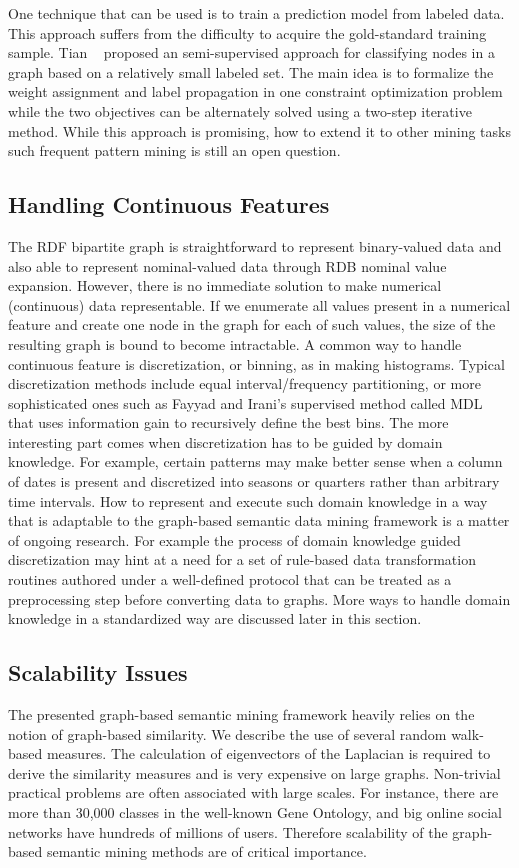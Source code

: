 One technique that can be used is to train a prediction model from labeled data. This approach suffers from the difficulty to acquire the gold-standard training sample. Tian \etal~\cite{Tian2009AHyper} proposed an semi-supervised approach for classifying nodes in a graph based on a relatively small labeled set. The main idea is to formalize the weight assignment and label propagation in one constraint optimization problem while the two objectives can be alternately solved using a two-step iterative method. While this approach is promising, how to extend it to other mining tasks such frequent pattern mining is still an open question.

\subsection{Handling Continuous Features}
The RDF bipartite graph is straightforward to represent binary-valued data and also able to represent nominal-valued data through RDB nominal value expansion. However, there is no immediate solution to make numerical (continuous) data representable. If we enumerate all values present in a numerical feature and create one node in the graph for each of such values, the size of the resulting graph is bound to become intractable. A common way to handle continuous feature is discretization, or binning, as in making histograms. Typical discretization methods include equal interval/frequency partitioning, or more sophisticated ones such as Fayyad and Irani's supervised method called MDL~\cite{FayyadI93discretization} that uses information gain to recursively define the best bins. The more interesting part comes when discretization has to be guided by domain knowledge. For example, certain patterns may make better sense when a column of dates is present and discretized into seasons or quarters rather than arbitrary time intervals. How to represent and execute such domain knowledge in a way that is adaptable to the graph-based semantic data mining framework is a matter of ongoing research. For example the process of domain knowledge guided discretization may hint at a need for a set of rule-based data transformation routines authored under a well-defined protocol that can be treated as a preprocessing step before converting data to graphs. More ways to handle domain knowledge in a standardized way are discussed later in this section.

\subsection{Scalability Issues}
The presented graph-based semantic mining framework heavily relies on the notion of graph-based similarity. We describe the use of several random walk-based measures. The calculation of eigenvectors of the Laplacian is required to derive the similarity measures and is very expensive on large graphs. Non-trivial practical problems are often associated with large scales. For instance, there are more than 30,000 classes in the well-known Gene Ontology, and big online social networks have hundreds of millions of users. Therefore scalability of the graph-based semantic mining methods are of critical importance.

